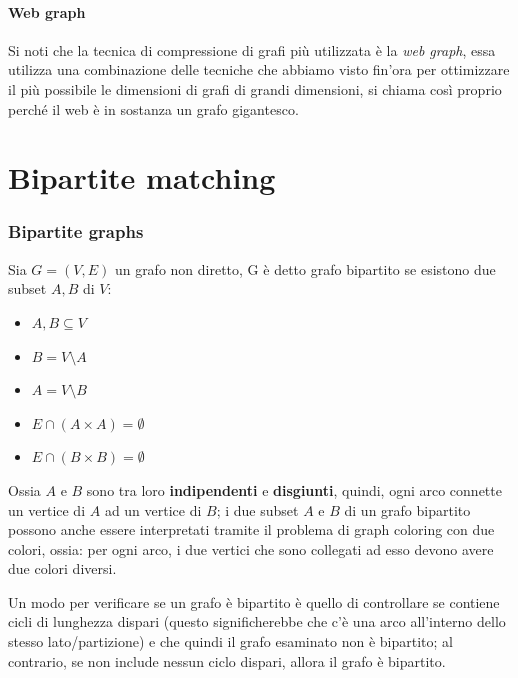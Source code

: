 \documentclass[12pt,a4paper]{article}
\begin{document}
\subsection{Web graph}
Si noti che la tecnica di compressione di grafi più utilizzata è la \textit{web graph}, essa utilizza una combinazione delle tecniche che abbiamo visto fin'ora per ottimizzare il più possibile le dimensioni di grafi di grandi dimensioni, si chiama così proprio perché il web è in sostanza un grafo gigantesco.

\pagebreak
\part{Bipartite matching}

\section{Bipartite graphs}
Sia $G = (V, E)$ un grafo non diretto, G è detto grafo bipartito se esistono due subset $A, B$ di $V$:
\begin{itemize}
\item $A, B \subseteq V$
\item $B = V \setminus A$
\item $A = V \setminus B$
\item $E \cap (A \times A) = \emptyset$
\item $E \cap (B \times B) = \emptyset$
\end{itemize}
Ossia $A$ e $B$ sono tra loro \textbf{indipendenti} e \textbf{disgiunti}, quindi, ogni arco connette un vertice di $A$ ad un vertice di $B$; i due subset $A$ e $B$ di un grafo bipartito possono anche essere interpretati tramite il problema di graph coloring con due colori, ossia: per ogni arco, i due vertici che sono collegati ad esso devono avere due colori diversi.

Un modo per verificare se un grafo è bipartito è quello di controllare se contiene cicli di lunghezza dispari (questo significherebbe che c'è una arco all'interno dello stesso lato/partizione) e che quindi il grafo esaminato non è bipartito; al contrario, se non include nessun ciclo dispari, allora il grafo è bipartito.
\end{document}
